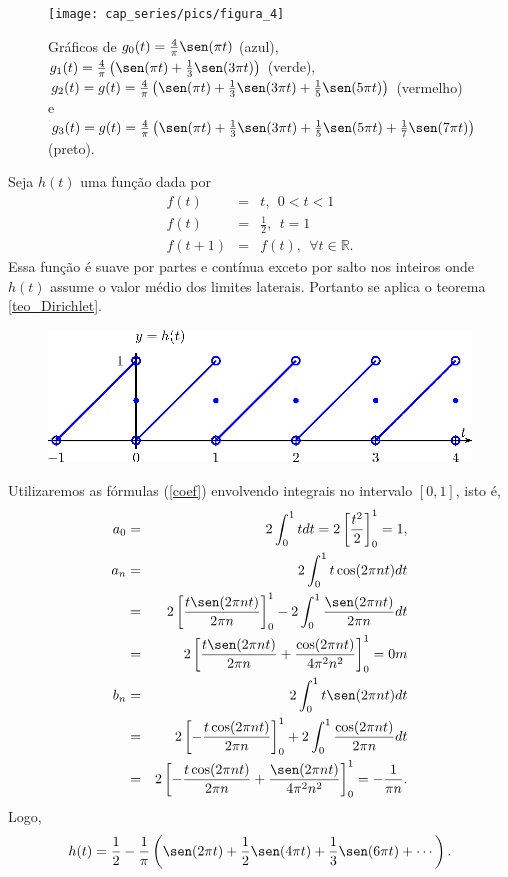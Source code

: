 \begin{ex}
\begin{figure}[!ht]
\begin{center}
\texttt{[image: cap\_series/pics/figura\_4]}\end{center}
\caption{\label{fig_conv_quadrangular}Gráficos de $g_0(t)=\frac{4}{\pi}\sen(\pi t)$ (azul), $g_1(t)=\frac{4}{\pi}\left(\sen(\pi t)+\frac{1}{3}\sen(3\pi t)\right)$ (verde), $g_2(t)=g(t)=\frac{4}{\pi}\left(\sen(\pi t)+\frac{1}{3}\sen(3\pi t)+\frac{1}{5}\sen(5\pi t)\right)$ (vermelho) e $g_3(t)=g(t)=\frac{4}{\pi}\left(\sen(\pi t)+\frac{1}{3}\sen(3\pi t)+\frac{1}{5}\sen(5\pi t)+\frac{1}{7}\sen(7\pi t)\right)$ (preto).}
\end{figure}
\end{ex}
\begin{ex} Seja $h(t)$ uma função dada por
\begin{eqnarray*}
f(t)&=&t, \ \ 0<t<1\\
f(t)&=&\frac{1}{2}, \ \ t=1\\
f(t+1)&=&f(t),\ \ \forall t\in\mathbb{R}.
\end{eqnarray*}
Essa função é suave por partes e contínua exceto por salto nos inteiros onde $h(t)$ assume o valor médio dos limites laterais. Portanto se aplica o teorema \ref{teo_Dirichlet}.
\begin{figure}[!ht]
\begin{center}
\includegraphics{cap_series/pics/figura_5}\end{center}
\end{figure}
Utilizaremos as fórmulas (\ref{coef}) envolvendo integrais no intervalo $[0,1]$, isto é,
  \begin{eqnarray*}
   a_0&=& 2\int_{0}^{1} t dt=2\left[\frac{t^2}{2}\right]_0^1=1,\\
	a_n&=&  2\int_{0}^{1} t\cos(2 \pi n t)dt\\
   &=&2\left[\frac{t\sen(2 \pi n t)}{2 \pi n}\right]_0^1-2\int_0^1\frac{\sen(2 \pi n t)}{2 \pi n}dt\\
	&=&2\left[\frac{t\sen(2 \pi n t)}{2 \pi n}+\frac{\cos(2 \pi n t)}{4\pi^2 n^2}\right]_0^1=0m\\
	 b_n&=&  2\int_{0}^{1} t\sen(2 \pi n t)dt\\
    &=&2\left[-\frac{t\cos(2 \pi n t)}{2 \pi n}\right]_0^1+2\int_0^1\frac{\cos(2 \pi n t)}{2 \pi n}dt\\
	&=&2\left[-\frac{t\cos(2 \pi n t)}{2 \pi n}+\frac{\sen(2 \pi n t)}{4\pi^2 n^2}\right]_0^1=-\frac{1}{\pi n}.
	 \end{eqnarray*}
Logo,
\begin{equation}
h(t)=\frac{1}{2}-\frac{1}{\pi}\left(\sen(2 \pi t)+\frac{1}{2}\sen(4\pi t)+\frac{1}{3}\sen(6\pi t)+\cdots\right).
\end{equation}
\end{ex}
